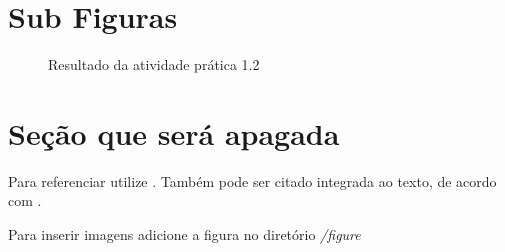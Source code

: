 \section{Sub Figuras}

\begin{figure}[H] %
  \center
  \caption{Resultado da atividade prática 1.2}\label{fig:ap1_cod_vigual1}

\end{figure}

\section{Seção que será apagada}

Para referenciar utilize \cite{ninguem2022curioso}. Também pode ser citado integrada ao texto, de acordo com .

Para inserir imagens adicione a figura no diretório \textit{/figure}

